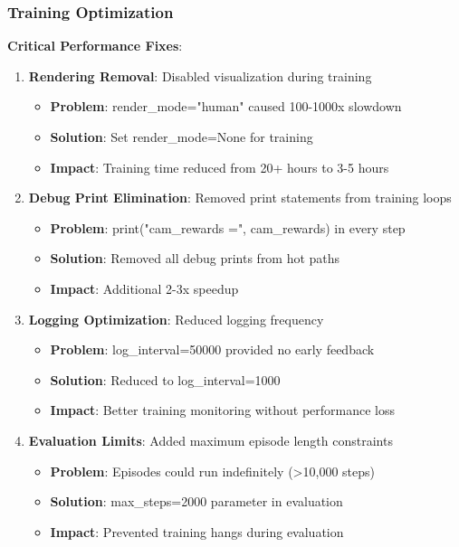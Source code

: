 \documentclass[12pt,a4paper]{report}
\begin{document}
\subsubsection{Training Optimization}
\textbf{Critical Performance Fixes}:
\begin{enumerate}
\item \textbf{Rendering Removal}: Disabled visualization during training
\begin{itemize}
\item \textbf{Problem}: render\_mode="human" caused 100-1000x slowdown
\item \textbf{Solution}: Set render\_mode=None for training
\item \textbf{Impact}: Training time reduced from 20+ hours to 3-5 hours
\end{itemize}

\item \textbf{Debug Print Elimination}: Removed print statements from training loops
\begin{itemize}
\item \textbf{Problem}: print("cam\_rewards =", cam\_rewards) in every step
\item \textbf{Solution}: Removed all debug prints from hot paths
\item \textbf{Impact}: Additional 2-3x speedup
\end{itemize}

\item \textbf{Logging Optimization}: Reduced logging frequency
\begin{itemize}
\item \textbf{Problem}: log\_interval=50000 provided no early feedback
\item \textbf{Solution}: Reduced to log\_interval=1000
\item \textbf{Impact}: Better training monitoring without performance loss
\end{itemize}

\item \textbf{Evaluation Limits}: Added maximum episode length constraints
\begin{itemize}
\item \textbf{Problem}: Episodes could run indefinitely (>10,000 steps)
\item \textbf{Solution}: max\_steps=2000 parameter in evaluation
\item \textbf{Impact}: Prevented training hangs during evaluation
\end{itemize}
\end{enumerate}
\end{document}

